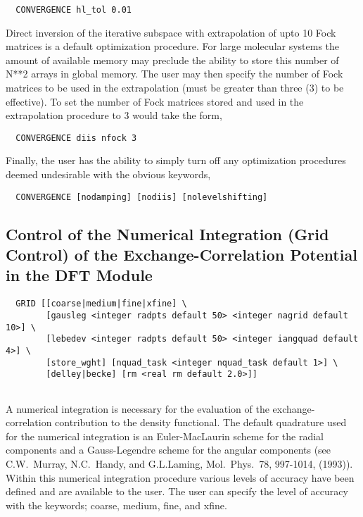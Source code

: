 \begin{verbatim}
  CONVERGENCE hl_tol 0.01
\end{verbatim}

Direct inversion of the iterative subspace with extrapolation of upto
10 Fock matrices is a default optimization procedure.  For large
molecular systems the amount of available memory may preclude the ability to
store this number of N**2 arrays in global memory.  The user may then
specify the number of Fock matrices to be used in the extrapolation
(must be greater than three (3) to be effective).  To set the number of
Fock matrices stored and used in the extrapolation procedure to 3
would take the form,

\begin{verbatim}
  CONVERGENCE diis nfock 3
\end{verbatim}

Finally, the user has the ability to simply turn off any optimization
procedures deemed undesirable with the obvious keywords,
\begin{verbatim}
  CONVERGENCE [nodamping] [nodiis] [nolevelshifting]
\end{verbatim}


\subsection{Control of the Numerical Integration (Grid Control) of the
  Exchange-Correlation Potential in the DFT Module}
\begin{verbatim}
  GRID [[coarse|medium|fine|xfine] \
        [gausleg <integer radpts default 50> <integer nagrid default 10>] \ 
        [lebedev <integer radpts default 50> <integer iangquad default 4>] \ 
        [store_wght] [nquad_task <integer nquad_task default 1>] \
        [delley|becke] [rm <real rm default 2.0>]]
        

\end{verbatim}

A numerical integration is necessary for the evaluation of the
exchange-correlation contribution to the density functional.  The
default quadrature used for the numerical integration is an
Euler-MacLaurin scheme for the radial components and a Gauss-Legendre
scheme for the angular components (see C.W.~Murray, N.C.~Handy, and
G.L.Laming, Mol.~Phys.~78, 997-1014, (1993)).  Within this numerical 
integration procedure various levels of accuracy have been defined and
are available to the user.  The user can specify the level of accuracy
with the keywords; coarse, medium, fine, and xfine.


